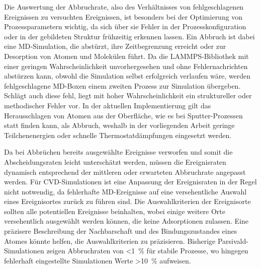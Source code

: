 Die Auswertung der Abbruchrate, also des Verhältnisses von fehlgeschlagenen Ereignissen zu versuchten Ereignissen, ist besonders bei der Optimierung von Prozessparametern wichtig, da sich über sie Fehler in der Prozesskonfiguration oder in der gebildeten Struktur frühzeitig erkennen lassen.
Ein Abbruch ist dabei eine MD-Simulation, die abstürzt, ihre Zeitbegrenzung erreicht oder zur Desorption von Atomen und Molekülen führt.
Da die LAMMPS-Bibliothek mit einer geringen Wahrscheinlichkeit unvorhergesehen und ohne Fehlernachrichten abstürzen kann, obwohl die Simulation selbst erfolgreich verlaufen wäre, werden fehlgeschlagene MD-Boxen einem zweiten Prozess zur Simulation übergeben.
Schlägt auch diese fehl, liegt mit hoher Wahrscheinlichkeit ein struktureller oder methodischer Fehler vor.
In der aktuellen Implementierung gilt das Herausschlagen von Atomen aus der Oberfläche, wie es bei Sputter-Prozessen statt finden kann, als Abbruch, weshalb in der vorliegenden Arbeit geringe Teilchenenergien oder schnelle Thermostatdämpfungen eingesetzt werden.

Da bei Abbrüchen bereits ausgewählte Ereignisse verworfen und somit die Abscheidungsraten leicht unterschätzt werden, müssen die Ereignisraten dynamisch entsprechend der mittleren oder erwarteten Abbruchrate angepasst werden.
Für CVD-Simulationen ist eine Anpassung der Ereignisraten in der Regel nicht notwendig, da fehlerhafte MD-Ereignisse auf eine versehentliche Auswahl eines Ereignisortes zurück zu führen sind.
Die Auswahlkriterien der Ereignisorte sollten alle potentiellen Ereignisse beinhalten, wobei einige weitere Orte versehentlich ausgewählt werden können, die keine Adsorptionen zulassen.
Eine präzisere Beschreibung der Nachbarschaft und des Bindungszustandes eines Atomes könnte helfen, die Auswahlkriterien zu präzisieren.
Bisherige Parsivald-Simulationen zeigen Abbruchraten von \SI{<1}{\percent} für stabile Prozesse, wo hingegen fehlerhaft eingestellte Simulationen Werte \SI{>10}{\percent} aufweisen.
